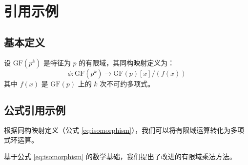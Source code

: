 
\section{引用示例}

\subsection{基本定义}

\begin{definition}
	设 $\mathrm{GF}(p^k)$ 是特征为 $p$ 的有限域，其同构映射定义为：
	\begin{equation}
		\label{eq:isomorphism} %
		\phi: \mathrm{GF}(p^k) \rightarrow \mathrm{GF}(p)[x]/(f(x))
	\end{equation}
	其中 $f(x)$ 是 $\mathrm{GF}(p)$ 上的 $k$ 次不可约多项式。
	
\end{definition}

\subsection{公式引用示例}

根据同构映射定义（公式 \eqref{eq:isomorphism}），我们可以将有限域运算转化为多项式环运算。

基于公式 \ref{eq:isomorphism} 的数学基础，我们提出了改进的有限域乘法方法。







